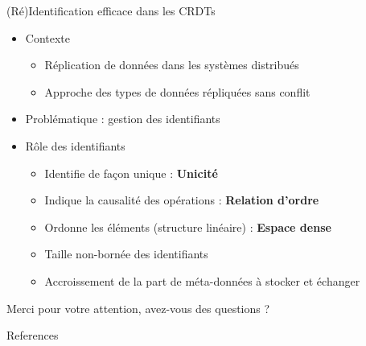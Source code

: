 \documentclass[10pt]{beamer}
\begin{document}
\begin{frame}{(Ré)Identification efficace dans les CRDTs}
  \begin{itemize}
    \item Contexte
    \begin{itemize}
      \item Réplication de données dans les systèmes distribués
      \item Approche des types de données répliquées sans conflit \cite{ShapiroSSS2011}
    \end{itemize}

    \item Problématique : gestion des identifiants

    \item Rôle des identifiants
    \begin{itemize}
      \item Identifie de façon unique : \textbf{Unicité}
      \item Indique la causalité des opérations : \textbf{Relation d'ordre}
      \item Ordonne les éléments (structure linéaire) : \textbf{Espace dense}
    \end{itemize}

    \begin{itemize}
      \item Taille non-bornée des identifiants
      \item Accroissement de la part de méta-données à stocker et échanger
    \end{itemize}



  \end{itemize}
\end{frame}

\begin{frame}[standout]
  Merci pour votre attention, avez-vous des questions ?
\end{frame}

\begin{frame}[allowframebreaks]{References}
	
	
\end{frame}
\end{document}
